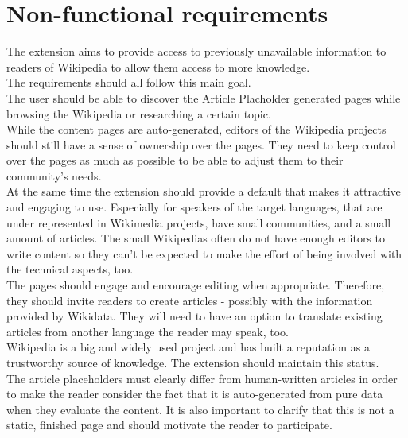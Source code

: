 \chapter{Non-functional requirements}

The extension aims to provide access to previously unavailable information to readers of Wikipedia to allow them access to more knowledge. \\
The requirements should all follow this main goal. \\
The user should be able to discover the Article Placholder generated pages while browsing the Wikipedia or researching a certain topic. \\
While the content pages are auto-generated, editors of the Wikipedia projects should still have a sense of ownership over the pages. They need to keep control over the pages as much as possible to be able to adjust them to their community's needs. \\
At the same time the extension should provide a default that makes it attractive and engaging to use. Especially for speakers of the target languages, that are under represented in Wikimedia projects, have small communities, and a small amount of articles. The small Wikipedias often do not have enough editors to write content so they can't be expected to make the effort of being involved with the technical aspects, too.  \\
The pages should engage and encourage editing when appropriate. Therefore, they should invite readers to create articles - possibly with the information provided by Wikidata. They will need to have an option to translate existing articles from another language the reader may speak, too. \\
Wikipedia is a big and widely used project and has built a reputation as a trustworthy source of knowledge. The extension should maintain this status. \\
The article placeholders must clearly differ from human-written articles in order to make the reader consider the fact that it is auto-generated from pure data when they evaluate the content. It is also important to clarify that this is not a static, finished page and should motivate the reader to participate. \\
